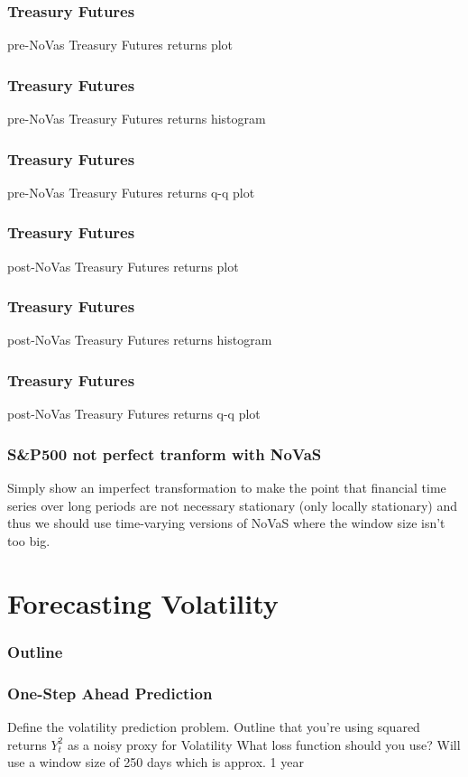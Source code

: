 \documentclass{beamer}
\begin{document}
\begin{frame}
\frametitle{Treasury Futures}
pre-NoVas Treasury Futures returns plot
\end{frame}

\begin{frame}
\frametitle{Treasury Futures}
pre-NoVas Treasury Futures returns histogram
\end{frame}

\begin{frame}
\frametitle{Treasury Futures}
pre-NoVas Treasury Futures returns q-q plot
\end{frame}

\begin{frame}
\frametitle{Treasury Futures}
post-NoVas Treasury Futures returns plot
\end{frame}

\begin{frame}
\frametitle{Treasury Futures}
post-NoVas Treasury Futures returns histogram
\end{frame}

\begin{frame}
\frametitle{Treasury Futures}
post-NoVas Treasury Futures returns q-q plot
\end{frame}

\begin{frame}
\frametitle{S&P500 not perfect tranform with NoVaS}
Simply show an imperfect transformation to make the point that financial time series over long periods are not necessary stationary (only locally stationary) and thus we should use time-varying versions of NoVaS where the window size isn't too big.
\end{frame}


\section{Forecasting Volatility}

\begin{frame}
\frametitle{Outline}
\tableofcontents[currentsection]
\end{frame}

\begin{frame}
\frametitle{One-Step Ahead Prediction}
Define the volatility prediction problem.
Outline that you're using squared returns $Y_{t}^2$ as a noisy proxy for Volatility
What loss function should you use?
Will use a window size of 250 days which is approx. 1 year
\end{frame}
\end{document}

